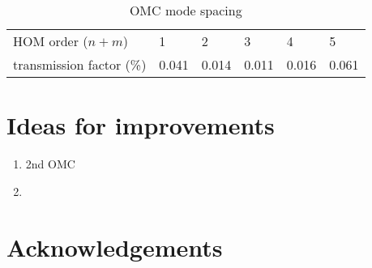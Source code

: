 \documentclass{ligodoc}
\begin{document}
\begin{table}
\centering
\caption{OMC mode spacing}
\begin{tabular}{l| l l l l l}
\hline
HOM order ($n+m$) & 1 & 2 & 3 & 4 & 5 \\
transmission factor (\%) &  0.041 & 0.014 & 0.011 & 0.016 & 0.061 \\
\hline
\end{tabular}
\label{tab:HOMtrans}
\end{table}



\section{Ideas for improvements}

\begin{enumerate}
\item 2nd OMC
\item 

\end{enumerate}



\section{Acknowledgements}
\end{document}
